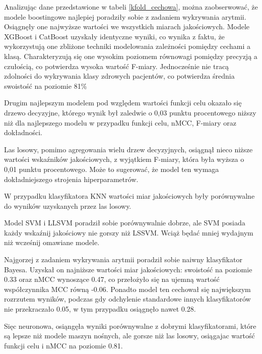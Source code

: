 \documentclass[a4paper,twoside,12pt]{book}
\begin{document}
Analizując dane przedstawione w tabeli \ref{kfold_cechowa}, można zaobserwować, że modele boostingowe najlepiej poradziły sobie z zadaniem wykrywania arytmii. Osiągnęły one najwyższe wartości we wszystkich miarach jakościowych. Modele XGBoost i CatBoost uzyskały identyczne wyniki, co wynika z faktu, że wykorzystują one zbliżone techniki modelowania zależności pomiędzy cechami a klasą. Charakteryzują się one wysokim poziomem równowagi pomiędzy precyzją a czułością, co potwierdza wysoka wartość F-miary. Jednocześnie nie tracą zdolności do wykrywania klasy zdrowych pacjentów, co potwierdza średnia swoistość na poziomie 81\%

Drugim najlepszym modelem pod względem wartości funkcji celu okazało się drzewo decyzyjne, którego wynik był zaledwie o 0,03 punktu procentowego niższy niż dla najlepszego modelu w przypadku funkcji celu, nMCC, F-miary oraz dokładności.

Las losowy, pomimo agregowania wielu drzew decyzyjnych, osiągnął nieco niższe wartości wskaźników jakościowych, z wyjątkiem F-miary, która była wyższa o 0,01 punktu procentowego. Może to sugerować, że model ten wymaga dokładniejszego strojenia hiperparametrów.

W przypadku klasyfikatora KNN wartości miar jakościowych były porównywalne do wyników uzyskanych przez las losowy.

Model SVM i LLSVM poradził sobie porównywalnie dobrze, ale SVM posiada każdy wskaźnij jakościowy nie gorszy niż LSSVM. Wciąż będać mniej wydajnym niż wcześnij omawiane modele.

Najgorzej z zadaniem wykrywania arytmii poradził sobie naiwny klasyfikator Bayesa. Uzyskał on najniższe wartości miar jakościowych: swoistość na poziomie 0.33 oraz nMCC wynoszące 0.47, co przełożyło się na ujemną wartość współczynnika MCC równą -0.06. Ponadto model ten cechował się największym rozrzutem wyników, podczas gdy odchylenie standardowe innych klasyfikatorów nie przekraczało 0.05, w tym przypadku osiągnęło nawet 0.28.

Sięc neuronowa, osiąngęła wyniki porównywalne z dobrymi klasyfikatorami, które są lepsze niż modele maszyn nośnych, ale gorsze niż las losowy, osiągajac wartość funkcji celu i nMCC na poziomie 0.81.
\end{document}
